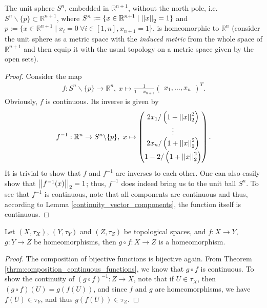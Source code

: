 \begin{exmp}
	The unit sphere $S^n$, embedded in $\mathbb R^{n+1}$, without the north pole, i.e. $S^n\backslash \{p\} \subset \mathbb R^{n+1}$, where $S^n := \{ x\in\mathbb R^{n+1} \mid \left\vert\left\vert x \right\vert\right\vert_{2} = 1 \}$ and $p := \{ x\in\mathbb R^{n+1} \mid x_i = 0 \ \forall i\in[1, n], x_{n+1} = 1 \}$, is homeomorphic to $\mathbb R^n$ (consider the unit sphere as a metric space with the \textit{induced metric} from the whole space of $\mathbb R^{n+1}$ and then equip it with the usual topology on a metric space given by the open sets). 
\end{exmp}
\begin{proof}
	Consider the map 
	\begin{align}
		f: S^n\backslash\{p\}\rightarrow \mathbb R^n, \ x\mapsto \frac{1}{1-x_{n+1}}\begin{pmatrix} x_1, \dots, x_n \end{pmatrix}^T. 
	\end{align}
	Obviously, $f$ is continuous. Its inverse is given by 
	\begin{align}\label{stereographic_map_inverse}
		f^{-1}: \mathbb R^n \rightarrow S^n\backslash\{p\}, \ x\mapsto \begin{pmatrix} 2x_1/ \left(1+\left\vert\left\vert x \right\vert\right\vert_{2}^2\right)\\ \vdots\\ 2x_n/\left(1+\left\vert\left\vert x \right\vert\right\vert_{2}^2\right) \\[4pt] 1-2/\left(1+\left\vert\left\vert x \right\vert\right\vert_{2}^2\right) \end{pmatrix}.  
	\end{align}
	It is trivial to show that $f$ and $f^{-1}$ are inverses to each other. One can also easily show that $\left\vert\left\vert f^{-1}(x) \right\vert\right\vert_{2} = 1$; thus, $f^{-1}$ does indeed bring us to the unit ball $S^n$. 
	To see that $f^{-1}$ is continuous, note that all components are continuous and thus, according to Lemma \ref{continuity_vector_components}, the function itself is continuous. 
\end{proof} 

\begin{theorem}\label{thrm:composition_homeomorphisms}
	Let $(X, \tau_X)$, $(Y, \tau_Y)$ and $(Z, \tau_Z)$ be topological spaces, and $f: X\to Y$, $g: Y\to Z$ be homeomorphisms, then $g\circ f: X\to Z$ is a homeomorphism.
\end{theorem}

\begin{proof}
	The composition of bijective functions is bijective again. From Theorem \ref{thrm:composition_continuous_functions}, we know that $g\circ f$ is continuous. To show the continuity of $(g\circ f)^{-1}: Z\to X$, note that if $U\in\tau_X$, then $(g\circ f)(U) = g(f(U))$, and since $f$ and $g$ are homeomorphisms, we have $f(U)\in \tau_Y$, and thus $g(f(U))\in\tau_Z$.
\end{proof}

